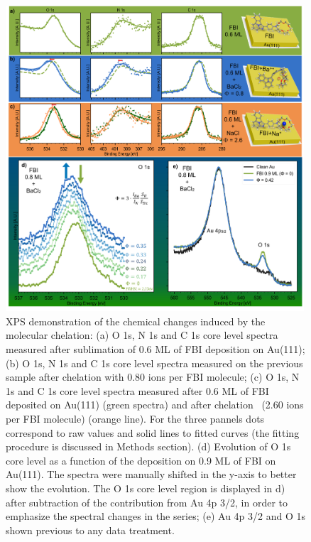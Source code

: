 \documentclass[aps,prl,reprint,longbibliography,superscriptaddress, english]{revtex4-1}
\begin{document}
\begin{figure}[ht!]
	\includegraphics[width=0.99\textwidth]{figures/Figure_2.png}
	\caption{\label{XPS_FBI_Au} 
    XPS demonstration of the chemical changes induced by the molecular chelation: (a) O 1s, N 1s and C 1s core level spectra measured after sublimation of 0.6 ML of FBI deposition on Au(111); (b) O 1s, N 1s and C 1s core level spectra measured on the previous sample after chelation with 0.80 \Bapp ions per FBI molecule; (c) O 1s, N 1s and C 1s core level spectra measured after 0.6 ML of FBI deposited on Au(111) (green spectra) and after chelation \Nap\ (2.60 \Nap ions per FBI molecule) (orange line). For the three pannels dots correspond to raw values and solid lines to fitted curves (the fitting procedure is discussed in Methods section). (d) Evolution of O 1s core level as a function of the \Bapp deposition on 0.9 ML of FBI on Au(111). The spectra were manually shifted in the y-axis to better show the evolution. The O 1s core level region is displayed in d) after subtraction of the contribution from Au 4p 3/2, in order to emphasize the spectral changes in the series; (e)  Au 4p 3/2 and O 1s shown previous to any data treatment.}
\end{figure}  
\end{document}
